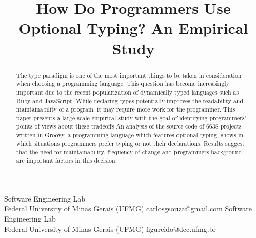 \documentclass[preprint]{sigplanconf}
\begin{document}
\setlength{\pdfpageheight}{\paperheight}
\setlength{\pdfpagewidth}{\paperwidth}






\title{How Do Programmers Use Optional Typing? An Empirical Study}

           {Software Engineering Lab\\Federal University of Minas Gerais (UFMG)}
           {carlosgsouza@gmail.com}
           {Software Engineering Lab\\Federal University of Minas Gerais (UFMG)}
           {figureido@dcc.ufmg.br}

\maketitle

\begin{abstract}
The type paradigm is one of the most important things to be taken in consideration when choosing a programming language. 
This question has become increasingly important due to the recent popularization of dynamically typed languages such as Ruby and JavaScript. 
While declaring types potentially improves the readability and maintainability of a program, it may require more work for the
programmer.
This paper presents a large scale empirical study with the goal of identifying programmers' points of views about these tradeoffs
An analysis of the source code of 6638 projects written in Groovy, a programming language which features optional typing, shows in which situations programmers prefer typing or not their declarations. 
Results suggest that the need for maintainability, frequency of change and programmers background are important factors in this decision.
\end{abstract}
\end{document}
